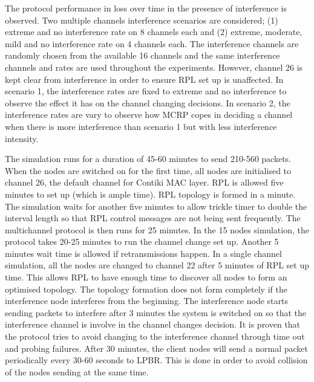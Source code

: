 
The protocol performance in loss over time in the presence of interference is observed. Two multiple channels interference scenarios are considered; (1) extreme and no interference rate on 8 channels each and (2) extreme, moderate, mild and no interference rate on 4 channels each. The interference channels are randomly chosen from the available 16 channels and the same interference channels and rates are used throughout the experiments. However, channel 26 is kept clear from interference in order to ensure RPL set up is unaffected. In scenario 1, the interference rates are fixed to extreme and no interference to observe the effect it has on the channel changing decisions. In scenario 2, the interference rates are vary to observe how MCRP copes in deciding a channel when there is more interference than scenario 1 but with less interference intensity. 

The simulation runs for a duration of 45-60 minutes to send 210-560 packets. When the nodes are switched on for the first time, all nodes are initialised to channel 26, the default channel for Contiki MAC layer. RPL is allowed five minutes to set up (which is ample time). RPL topology is formed in a minute. The simulation waits for another five minutes to allow trickle timer to double the interval length so that RPL control messages are not being sent frequently. The multichannel protocol is then runs for 25 minutes. In the 15 nodes simulation, the protocol takes 20-25 minutes to run the channel change set up. Another 5 minutes wait time is allowed if retransmissions happen. 
In a single channel simulation, all the nodes are changed to channel 22 after 5 minutes of RPL set up time. This allows RPL to have enough time to discover all nodes to form an optimised topology. The topology formation does not form completely if the interference node interferes from the beginning. The interference node starts sending packets to interfere after 3 minutes the system is switched on so that the interference channel is involve in the channel changes decision. It is proven that the protocol tries to avoid changing to the interference channel through time out and probing failures. After 30 minutes, the client nodes will send a normal packet periodically every 30-60 seconds to LPBR. This is done in order to avoid collision of the nodes sending at the same time. 

